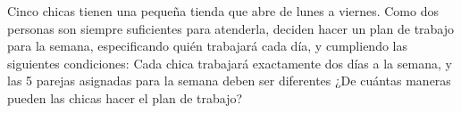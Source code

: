 Cinco chicas tienen una pequeña tienda que abre de lunes a viernes. Como dos personas son siempre suficientes para atenderla, deciden hacer un plan de trabajo para la semana, especificando quién trabajará cada día, y cumpliendo las siguientes condiciones: Cada chica trabajará exactamente dos días a la semana, y las 5 parejas asignadas para la semana deben ser diferentes
¿De cuántas maneras pueden las chicas hacer el plan de trabajo?
